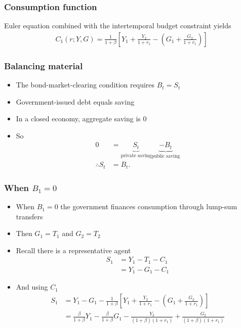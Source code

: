 \documentclass[presentation,dvipsnames]{beamer}
\begin{document}
\begin{frame}
\frametitle{Consumption function}
Euler equation combined with the intertemporal budget constraint yields
\begin{align*}
C_{1}(r;Y,G) = \frac{1}{1+\beta} \left[ Y_{1} + \frac{Y_{2}}{1+r_{1}} - \left( G_{1} + \frac{G_{2}}{1+r_{1}} \right) \right]
\end{align*}
\end{frame}

\begin{frame}
\frametitle{Balancing material}
\begin{itemize}[label={--}]
\item The bond-market-clearing condition requires $B_{t} = S_{t}$
\item Government-issued debt equals saving
\item In a closed economy, aggregate saving is $0$
\item So
\begin{align*}
0 &= \underbrace{S_{t}}_{\text{private saving}} \underbrace{- B_{t}}_{\text{public saving}} \\
\therefore S_{t} &= B_{t}.
\end{align*}
\end{itemize}
\end{frame}

\begin{frame}
\frametitle{When $B_{1} = 0$}
\begin{itemize}[label={--}]
\item When $B_{1} = 0$ the government finances consumption through lump-sum transfers
\item Then $G_{1} = T_{1}$ and $G_{2} = T_{2}$
\item Recall there is a representative agent
\begin{align*}
S_{1} &= Y_{1} - T_{1} - C_{1} \\
&= Y_{1} - G_{1} - C_{1}
\end{align*}
\item And using $C_{1}$
\begin{align*}
S_{1} &= Y_{1} - G_{1} - \frac{1}{1+\beta} \left[ Y_{1} + \frac{Y_{2}}{1+r_{1}} - \left( G_{1} + \frac{G_{2}}{1+r_{1}} \right) \right] \\
&= \frac{\beta}{1+\beta}Y_{1} - \frac{\beta}{1+\beta} G_{1} - \frac{Y_{2}}{(1+\beta)(1+r_{1})} + \frac{G_{2}}{(1+\beta)(1+r_{1})}
\end{align*}
\end{itemize}
\end{frame}
\end{document}
